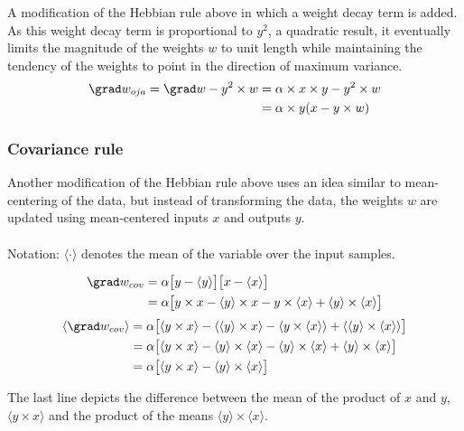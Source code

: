 \documentclass[main]{subfiles}
\begin{document}
A modification of the Hebbian rule above in which a weight decay term is added. As this weight decay term is proportional to $y^2$, a quadratic result, it eventually limits the magnitude of the weights $w$ to unit length while maintaining the tendency of the weights to point in the direction of maximum variance.
\begin{align}
    \grad w_{oja} = \grad w - y^2 \times w &= \alpha \times x \times y - y^2 \times w\\
        &= \alpha \times y (x - y \times w)
\end{align}

\subsubsection{Covariance rule}

Another modification of the Hebbian rule above uses an idea similar to mean-centering of the data, but instead of transforming the data, the weights $w$ are updated using mean-centered inputs $x$ and outputs $y$.
\\ \\
Notation: $\langle \cdot \rangle$ denotes the mean of the variable over the input samples.

\begin{align}
    \grad w_{cov} &= \alpha \big[y - \langle y\rangle\big]\big[x - \langle x\rangle\big]\\
        &= \alpha \big[y \times x - \langle y\rangle \times x - y \times \langle x\rangle + \langle y\rangle \times \langle x\rangle\big]
\end{align}
\begin{align}
    \langle \grad w_{cov}\rangle &= \alpha \big[\langle y \times x\rangle - \langle \langle y\rangle \times x\rangle - \langle y \times \langle x\rangle\rangle + \langle \langle y\rangle \times \langle x\rangle\rangle\big]\\
    &= \alpha \big[\langle y \times x\rangle - \langle y\rangle \times \langle x\rangle - \langle y\rangle \times \langle x\rangle + \langle y\rangle \times \langle x\rangle\big]\\
    &= \alpha \big[\langle y \times x\rangle - \langle y\rangle \times \langle x\rangle\big]
\end{align}

The last line depicts the difference between the mean of the product of $x$ and $y$, $\langle y \times x\rangle$ and the product of the means $\langle y\rangle \times \langle x\rangle$.
\end{document}
